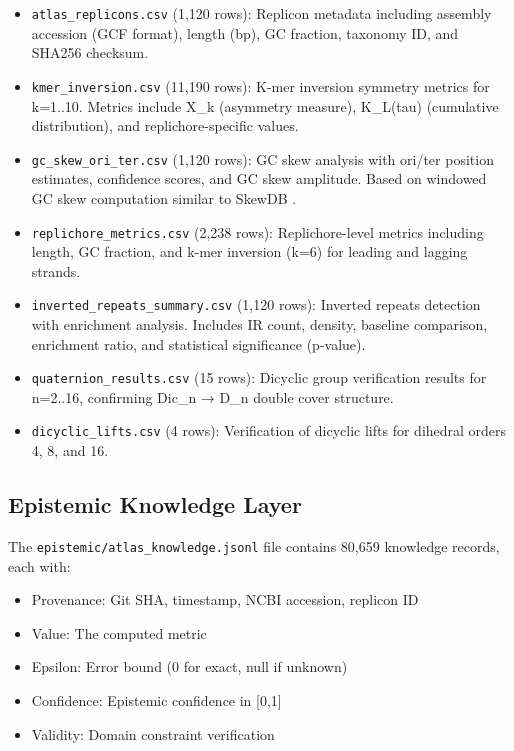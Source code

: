 \documentclass[12pt,a4paper]{article}
\begin{document}
\begin{itemize}
\item \texttt{atlas\_replicons.csv} (1,120 rows): Replicon metadata including assembly accession (GCF format), length (bp), GC fraction, taxonomy ID, and SHA256 checksum.

\item \texttt{kmer\_inversion.csv} (11,190 rows): K-mer inversion symmetry metrics for k=1..10. Metrics include X\_k (asymmetry measure), K\_L(tau) (cumulative distribution), and replichore-specific values.

\item \texttt{gc\_skew\_ori\_ter.csv} (1,120 rows): GC skew analysis with ori/ter position estimates, confidence scores, and GC skew amplitude. Based on windowed GC skew computation similar to SkewDB \cite{skewdb2020}.

\item \texttt{replichore\_metrics.csv} (2,238 rows): Replichore-level metrics including length, GC fraction, and k-mer inversion (k=6) for leading and lagging strands.

\item \texttt{inverted\_repeats\_summary.csv} (1,120 rows): Inverted repeats detection with enrichment analysis. Includes IR count, density, baseline comparison, enrichment ratio, and statistical significance (p-value).

\item \texttt{quaternion\_results.csv} (15 rows): Dicyclic group verification results for n=2..16, confirming Dic\_n → D\_n double cover structure.

\item \texttt{dicyclic\_lifts.csv} (4 rows): Verification of dicyclic lifts for dihedral orders 4, 8, and 16.
\end{itemize}

\subsection{Epistemic Knowledge Layer}

The \texttt{epistemic/atlas\_knowledge.jsonl} file contains 80,659 knowledge records, each with:
\begin{itemize}
\item Provenance: Git SHA, timestamp, NCBI accession, replicon ID
\item Value: The computed metric
\item Epsilon: Error bound (0 for exact, null if unknown)
\item Confidence: Epistemic confidence in [0,1]
\item Validity: Domain constraint verification
\end{itemize}
\end{document}
